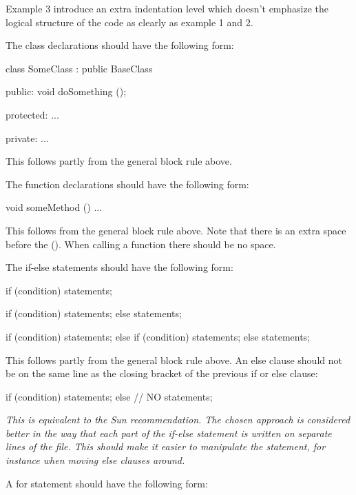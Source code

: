 \documentclass[a4paper,11pt,oneside]{scrbook}
\newcommand{\motivation}[1]{{\normalfont \itshape #1}}
\newcommand{\trcode}[1]{{\normalfont \ttfamily #1}}
\begin{document}
Example 3 introduce an extra indentation level which doesn't emphasize
the logical structure of the code as clearly as example 1 and 2.

The class declarations should have the following form: 

\begin{code}
  class SomeClass : public BaseClass {
    public: 
      void doSomething ();

    protected: 
      ... 

    private: 
      ... 
  }
\end{code}

This follows partly from the general block rule above.

The function declarations should have the following form: 

\begin{code}
  void someMethod () {
    ...
  }
\end{code}

This follows from the general block rule above. Note that there is an
extra space before the \trcode{()}. When calling a function there
should be no space.

The \trcode{if-else} statements should have the following form: 

\begin{code}
  if (condition) {
    statements;
  }

  if (condition) {
    statements;
  }
  else {
    statements;
  }

  if (condition) {
    statements;
  }
  else if (condition) {
    statements;
  }
  else {
    statements;
  }
\end{code}

This follows partly from the general block rule above. An else clause should not
be on the same line as the closing bracket of the previous if or else clause:

\begin{code}
  if (condition) {
    statements;
  } else {        // NO
    statements;
  }
\end{code}

\motivation{
  This is equivalent to the Sun recommendation. The chosen approach is
  considered better in the way that each part of the \trcode{if-else} statement
  is written on separate lines of the file. This should make it easier
  to manipulate the statement, for instance when moving else clauses
  around.
}

A for statement should have the following form: 
\end{document}
